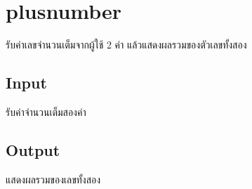 \documentclass{article}
\begin{document}
\section*{plusnumber}

รับค่าเลขจำนวนเต็มจากผู้ใช้ 2 ค่า แล้วแสดงผลรวมของตัวเลขทั้งสอง\\



\subsection*{Input}
{รับค่าจำนวนเต็มสองค่า}\\



\subsection*{Output}
{แสดงผลรวมของเลขทั้งสอง}\\
\end{document}
